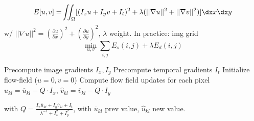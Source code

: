 \[
    E[u, v] = \! \iint_\Omega [(I_x u + I_y v + I_t)^2 + \lambda(||\nabla u||^2 + ||\nabla v||^2)] \dx x \dx y
\]
w/ $||\nabla u||^2 = \left( \frac{\partial u}{\partial x} \right)^2 + \left( \frac{\partial u}{\partial y} \right)^2$, $\lambda$ weight.
In practice: img grid
\[
    \min_{u, v} \sum_{i, j} E_s(i, j) + \lambda E_d(i, j)
\]

\begin{algorithm}
    \caption{Horn-Schunck}
    \begin{algorithmic}[1]
        \State Precompute image gradients $I_x, I_y$
        \State Precompute temporal gradients $I_t$
        \State Initialize flow-field ($u = 0, v = 0$)
        \State Compute flow field updates for each pixel $\hat{u}_{kl} = \overline{u}_{kl} - Q \cdot I_x$, $\hat{v}_{kl} = \overline{v}_{kl} - Q \cdot I_y$
        \EndWhile
    \end{algorithmic}
\end{algorithm}
with $Q = \frac{I_x \overline{u}_{kl} + I_y \overline{v}_{kl} + I_t}{\lambda^{-1} + I_x^2 + I_y^2}$, with $\overline{u}_{kl}$ prev value, $\hat{u}_{kl}$ new value.
